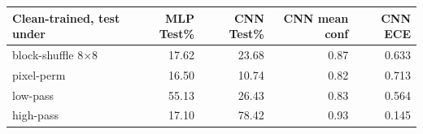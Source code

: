 \begin{tabular}{lrrrr}
\toprule
Clean-trained, test under & MLP Test\% & CNN Test\% & CNN mean conf & CNN ECE \\
\midrule
block-shuffle 8$\times$8 & 17.62 & 23.68 & 0.87 & 0.633 \\
pixel-perm & 16.50 & 10.74 & 0.82 & 0.713 \\
low-pass & 55.13 & 26.43 & 0.83 & 0.564 \\
high-pass & 17.10 & 78.42 & 0.93 & 0.145 \\
\bottomrule
\end{tabular}
